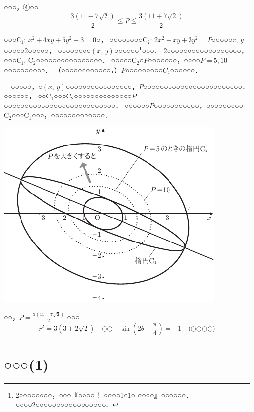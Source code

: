 \begin{解答}
○○○，④○○
\[
\frac{3(11-7\sqrt{2})}{2}\leqq P\leqq\frac{3(11+7\sqrt{2})}{2}\tag*{\kotae}
\]
\setcounter{footnote}{4}
{\footnotesize
\textbf{}\quad ○○○$\mathrm{C}_1: \, x^2+4xy+5y^2-3=0$○，
○○○○○○○○$\mathrm{C}_2: \, 2x^2+xy+3y^2=P$○○○○○$x, \, y$○○○○○2○○○○○，
○○○○○○○○$(x, \, y)$○○○○○○\footnote{2○○○○○○○○，○○○『○○○○！ ○○○○1○1○ ○○○○』○○○○○○．○○○○2○○○○○○○○○○○○○○○○○．}○○○．
2○○○○○○○○○○○○○○○○○○，○○○$\mathrm{C}_1, \, \mathrm{C}_2$○○○○○○○○○○○○○○○○．
○○○○○$\mathrm{C}_2$○$P$○○○○○○○，○○○○$P=5, 10$○○○○○○○○○○．
（○○○○○○○○○○○○，）$P$○○○○○○○○○$C_2$○○○○○○．

　○○○○○，○$(x, \, y)$○○○○○○○○○○○○○○○○，$P$○○○○○○○○○○○○○○○○○○○○○○○○．
○○○○○○，
○○$\mathrm{C}_1$○○○$\mathrm{C}_2$○○○○○○○○○○○○○○$P$○○○○○○○○○○○○○○○○○○○○○○○○○○○．
○○○○○○$P$○○○○○○○○○○○，○○○○○○○○○$\mathrm{C}_2$○○○$\mathrm{C}_1$○○○，○○○○○○○○○○○○○．
\begin{center}
\includegraphics[scale=1]{./fig/sec00_betsu02.pdf}
\end{center}

○○，\hspace{1zw}$P=\frac{3(11\pm 7\sqrt{2})}{2}$ ○○○
\[
r^{2}=3(3\pm 2\sqrt{2}) \quad  \text{○○} \quad  \sin\left(2\theta-\frac{\pi}{4}\right)=\mp 1\quad \text{(○○○○)}
\]\par}
\end{解答}
\section{○○○(1)}


